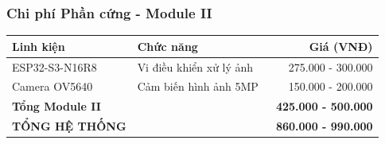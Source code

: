\begin{frame}
\frametitle{Chi phí Phần cứng - Module II}

\begin{table}[h]
\centering
\begin{tabular}{|l|l|r|}
\hline
\textbf{Linh kiện} & \textbf{Chức năng} & \textbf{Giá (VNĐ)} \\
\hline
ESP32-S3-N16R8 & Vi điều khiển xử lý ảnh & 275.000 - 300.000 \\
Camera OV5640 & Cảm biến hình ảnh 5MP & 150.000 - 200.000 \\
\hline
\textbf{Tổng Module II} & & \textbf{~425.000 - 500.000} \\
\hline
\hline
\textbf{TỔNG HỆ THỐNG} & & \textbf{~860.000 - 990.000} \\
\hline
\end{tabular}
\end{table}


\end{frame}
